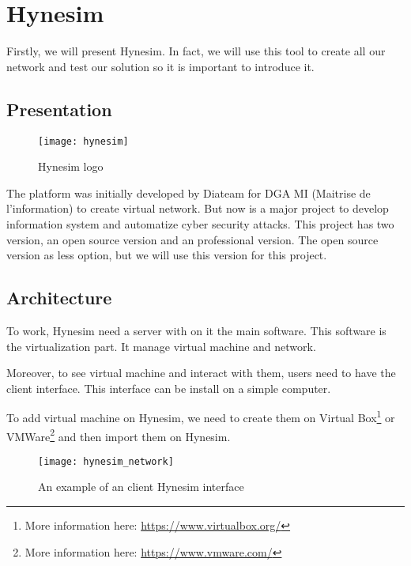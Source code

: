 
\chapter{Hynesim}
\label{chap:hynesim}

Firstly, we will present Hynesim. In fact, we will use this tool to create all our network and test our solution so
it is important to introduce it.

\section{Presentation}

\begin{figure}[h]
  \centering
  \texttt{[image: hynesim]}
  \caption{Hynesim logo}
  \label{fig:hynesim}
\end{figure}



The platform was initially developed by Diateam for DGA MI (Maitrise de l'information) to create virtual network.
But now is a major project to develop information system and automatize cyber security attacks. This project has
two version, an open source version and an professional version. The open source version as less option, but we
will use this version for this project.

\section{Architecture}

To work, Hynesim need a server with on it the main software. This software is the virtualization part. It manage
virtual machine and network.

Moreover, to see virtual machine and interact with them, users need to have the client interface. This interface
can be install on a simple computer.

To add virtual machine on Hynesim, we need to create them on Virtual Box\footnote{More information here:
  \url{https://www.virtualbox.org/}} or VMWare\footnote{More information here: \url{https://www.vmware.com/}} and
then import them on Hynesim.

\begin{figure}[h]
  \centering
  \texttt{[image: hynesim\_network]}
  \caption{An example of an client Hynesim interface}
\end{figure}





